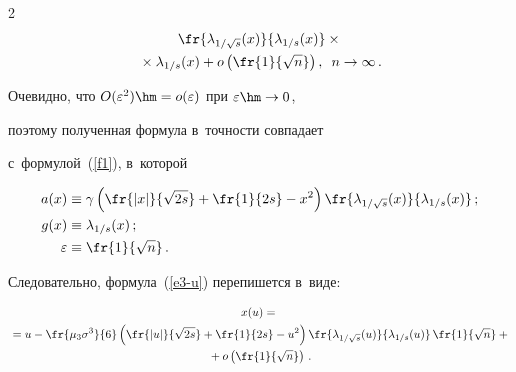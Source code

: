 \begin{multicols}{2}
\begin{multline*}
\fr{\lambda_{1/\sqrt{s}}(x)}{\lambda_{1/s}(x)} \times {}\\

{} \times\lambda_{1/s}(x)+o\left(\fr{1}{\sqrt{n}}\right),\enskip n\rightarrow\infty\,. 

\end{multline*}



\vspace*{-12pt}



\pagebreak



\noindent

Очевидно, что $O(\varepsilon^2)\hm=o(\varepsilon)$ при $\varepsilon\hm\rightarrow 0$, 

поэтому полученная формула в~точности совпадает 

с~формулой~(\ref{f1}), в~которой 



\noindent

\begin{align*}

a(x) &\equiv \gamma\left( \fr{\left|x\right|}{\sqrt{2s}}+

\fr{1}{2s}-x^2\right)\fr{\lambda_{1/\sqrt{s}}(x)}{\lambda_{1/s}(x)}\,;\\

 g(x) &\equiv \lambda_{1/s}(x)\,; \\

\varepsilon &\equiv \fr{1}{\sqrt{n}}\,. 

\end{align*}

Следовательно, формула~(\ref{e3-u}) перепишется в~виде:  



\noindent

\begin{multline*}

x(u)={}\\

{}=u-\fr{\mu_{3}\sigma^{3}}{6}\left(\fr{|u|}{\sqrt{2s}} +

\fr{1}{2s}-u^{2}\right)  

\fr{\lambda_{1/\sqrt{s}}(u)}{\lambda_{1/s}(u)}\, \fr{1}{\sqrt{n}} + {}\\

{}+

o\left(\fr{1}{\sqrt{n}}\right)\,.

\end{multline*}




\end{multicols}
